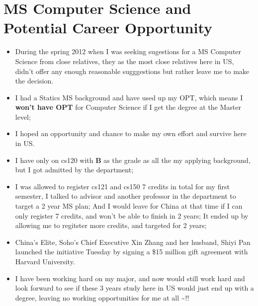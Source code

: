 \documentclass[9pt,b5paper]{article}
\begin{document}
\section{MS Computer Science and Potential Career Opportunity}
\label{sec-9}
\begin{itemize}
\item During the spring 2012 when I was seeking sugestions for a MS Computer Science from close relatives, they as the most close relatives here in US, didn't offer any enough reasonable sugggestions but rather leave me to make the decision.
\item I had a Statics MS background and have used up my OPT, which means I \textbf{won't have OPT} for Computer Science if I get the degree at the Master level;
\item I hoped an opportunity and chance to make my own effort and survive here in US.
\item I have only on cs120 with \textbf{B} as the grade as all the my applying background, but I got admitted by the department;
\item I was allowed to register cs121 and cs150 7 credits in total for my first semester, I talked to advisor and another professor in the department to target a 2 year MS plan; And I would leave for China at that time if I can only register 7 credits, and won't be able to finish in 2 years; It ended up by allowing me to regitster more credits, and targeted for 2 years;
\item China's Elite, Soho's Chief Executive Xin Zhang and her husband, Shiyi Pan launched the initiative Tuesday by signing a \$15 million gift agreement with Harvard University.
\item I have been working hard on my major, and now would still work hard and look forward to see if these 3 years study here in US would just end up with a degree, leaving no working opportunities for me at all \textasciitilde{}!!
\end{itemize}
\end{document}
